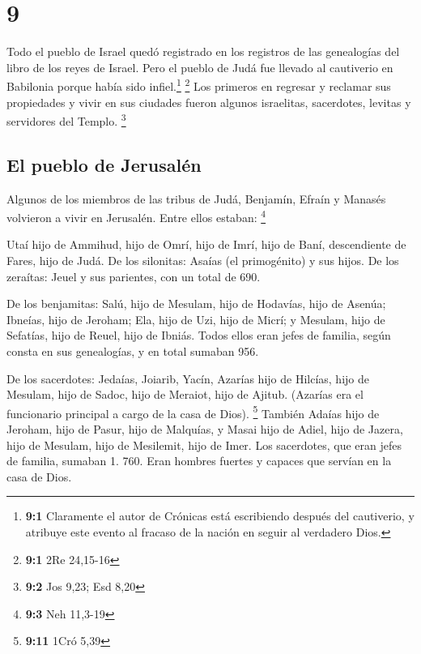 \hypertarget{section-8}{%
\section{9}\label{section-8}}

 Todo el pueblo de Israel quedó registrado en los
registros de las genealogías del libro de los reyes de Israel. Pero el
pueblo de Judá fue llevado al cautiverio en Babilonia porque había sido
infiel.\footnote{\textbf{9:1} Claramente el autor de Crónicas está
  escribiendo después del cautiverio, y atribuye este evento al fracaso
  de la nación en seguir al verdadero Dios.} \footnote{\textbf{9:1} 2Re
  24,15-16}  Los primeros en regresar y reclamar sus
propiedades y vivir en sus ciudades fueron algunos israelitas,
sacerdotes, levitas y servidores del Templo. \footnote{\textbf{9:2} Jos
  9,23; Esd 8,20}

\hypertarget{el-pueblo-de-jerusaluxe9n}{%
\subsection{El pueblo de Jerusalén}\label{el-pueblo-de-jerusaluxe9n}}

 Algunos de los miembros de las tribus de Judá, Benjamín,
Efraín y Manasés volvieron a vivir en Jerusalén. Entre ellos estaban:
\footnote{\textbf{9:3} Neh 11,3-19}

 Utaí hijo de Ammihud, hijo de Omrí, hijo de Imrí, hijo de
Baní, descendiente de Fares, hijo de Judá.  De los
silonitas: Asaías (el primogénito) y sus hijos.  De los
zeraítas: Jeuel y sus parientes, con un total de 690.

 De los benjamitas: Salú, hijo de Mesulam, hijo de
Hodavías, hijo de Asenúa;  Ibneías, hijo de Jeroham; Ela,
hijo de Uzi, hijo de Micrí; y Mesulam, hijo de Sefatías, hijo de Reuel,
hijo de Ibniás.  Todos ellos eran jefes de familia, según
consta en sus genealogías, y en total sumaban 956.

 De los sacerdotes: Jedaías, Joiarib, Yacín,
 Azarías hijo de Hilcías, hijo de Mesulam, hijo de Sadoc,
hijo de Meraiot, hijo de Ajitub. (Azarías era el funcionario principal a
cargo de la casa de Dios). \footnote{\textbf{9:11} 1Cró 5,39}
 También Adaías hijo de Jeroham, hijo de Pasur, hijo de
Malquías, y Masai hijo de Adiel, hijo de Jazera, hijo de Mesulam, hijo
de Mesilemit, hijo de Imer.  Los sacerdotes, que eran
jefes de familia, sumaban 1. 760. Eran hombres fuertes y capaces que
servían en la casa de Dios.

